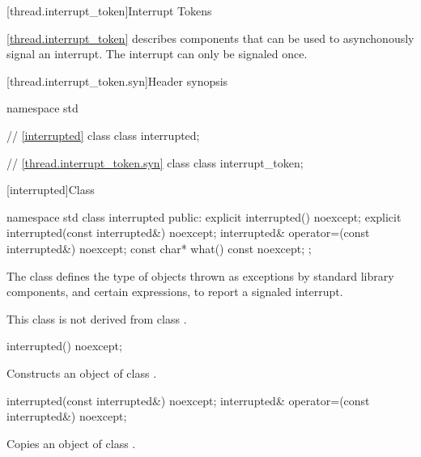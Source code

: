 {\color{insertcolor}

[thread.interrupt_token]{Interrupt Tokens}

\pnum
\ref{thread.interrupt_token} describes components that can be used to
asynchonously signal an interrupt.
The interrupt can only be signaled once.

[thread.interrupt_token.syn]{Header  synopsis}
%

\begin{codeblock}
namespace std {
  // \ref{interrupted} class 
  class interrupted;

  // \ref{thread.interrupt_token.syn} class 
  class interrupt_token;
}
\end{codeblock}

%
[interrupted]{Class }

%
\begin{codeblock}
namespace std {
  class interrupted {
  public:
    explicit interrupted() noexcept;
    explicit interrupted(const interrupted&) noexcept;
    interrupted& operator=(const interrupted&) noexcept;
    const char* what() const noexcept;
  };
}
\end{codeblock}

\pnum
The class
defines the type of objects thrown as
exceptions by \Cpp{} standard library components,
and certain expressions, to report a signaled interrupt.
\begin{note} This class is not derived from class . \end{note}

%
\begin{itemdecl}
interrupted() noexcept;
\end{itemdecl}

\begin{itemdescr}
\pnum
\effects
Constructs an object of class
.
\end{itemdescr}

%
%
\begin{itemdecl}
interrupted(const interrupted&) noexcept;
interrupted& operator=(const interrupted&) noexcept;
\end{itemdecl}
\begin{itemdescr}
  \pnum \effects Copies an object of class .


\end{itemdescr}}
